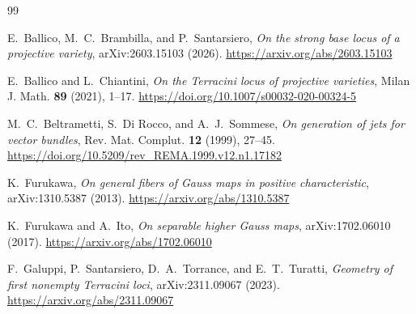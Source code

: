 \documentclass[11pt]{article}
\begin{document}
\begin{thebibliography}{99}

E.~Ballico, M.~C.~Brambilla, and P.~Santarsiero,
\emph{On the strong base locus of a projective variety},
arXiv:2603.15103 (2026).
\url{https://arxiv.org/abs/2603.15103}

E.~Ballico and L.~Chiantini,
\emph{On the Terracini locus of projective varieties},
Milan J. Math. \textbf{89} (2021), 1--17.
\url{https://doi.org/10.1007/s00032-020-00324-5}

M.~C.~Beltrametti, S.~Di Rocco, and A.~J.~Sommese,
\emph{On generation of jets for vector bundles},
Rev. Mat. Complut. \textbf{12} (1999), 27--45.
\url{https://doi.org/10.5209/rev_REMA.1999.v12.n1.17182}

K.~Furukawa,
\emph{On general fibers of Gauss maps in positive characteristic},
arXiv:1310.5387 (2013).
\url{https://arxiv.org/abs/1310.5387}

K.~Furukawa and A.~Ito,
\emph{On separable higher Gauss maps},
arXiv:1702.06010 (2017).
\url{https://arxiv.org/abs/1702.06010}

F.~Galuppi, P.~Santarsiero, D.~A.~Torrance, and E.~T.~Turatti,
\emph{Geometry of first nonempty Terracini loci},
arXiv:2311.09067 (2023).
\url{https://arxiv.org/abs/2311.09067}

\end{thebibliography}
\end{document}
